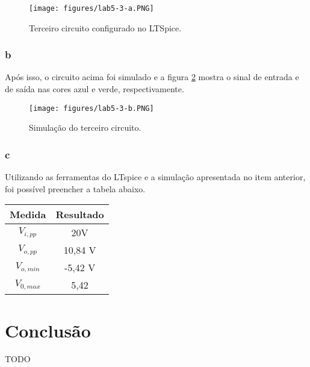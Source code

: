 \documentclass[a4paper]{report}
\begin{document}
\begin{figure}[H]
    \centering
    \texttt{[image: figures/lab5-3-a.PNG]}
    \caption{Terceiro circuito configurado no LTSpice.}
    \label{fig:figures-lab5-3-a-png}
\end{figure}

\subsubsection*{b}

Após isso, o circuito acima foi simulado e a figura \ref{fig:figures-lab5-3-b-png} mostra o sinal de entrada e de saída nas cores azul e verde, respectivamente.

\begin{figure}[H]
    \centering
    \texttt{[image: figures/lab5-3-b.PNG]}
    \caption{Simulação do terceiro circuito.}
    \label{fig:figures-lab5-3-b-png}
\end{figure}

\subsubsection*{c}

Utilizando as ferramentas do LTspice e a simulação apresentada no item anterior, foi possível preencher a tabela abaixo.

\begin{table}[H]
    \centering
    \begin{tabular}{c | c}
	Medida & Resultado \\
	\hline
	$V_{i,pp}$ & 20V \\
	$V_{o,pp}$ & 10,84 V \\
	$V_{o,min}$ & -5,42 V \\
	$V_{0,max}$ & 5,42
\end{tabular}
\end{table}

\section{Conclusão}

TODO
\end{document}
